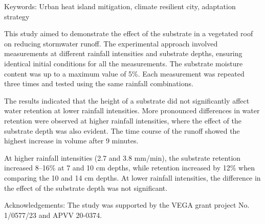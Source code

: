Keywords: Urban heat island mitigation, climate resilient city, adaptation strategy
\newpage{}
{}
\begin{flushleft}





\end{flushleft}

\noindent

This study aimed to demonstrate the effect of the substrate in a vegetated roof on reducing stormwater runoff. The experimental approach involved measurements at different rainfall intensities and substrate depths, ensuring identical initial conditions for all the measurements. The substrate moisture content was up to a maximum value of 5\%. Each measurement was repeated three times and tested using the same rainfall combinations.

The results indicated that the height of a substrate did not significantly affect water retention at lower rainfall intensities. More pronounced differences in water retention were observed at higher rainfall intensities, where the effect of the substrate depth was also evident. The time course of the runoff showed the highest increase in volume after 9 minutes.

At higher rainfall intensities (2.7 and 3.8 mm/min), the substrate retention increased 8–16\% at 7 and 10 cm depths, while retention increased by 12\% when comparing the 10 and 14 cm depths. At lower rainfall intensities, the difference in the effect of the substrate depth was not significant.

Acknowledgements: The study was supported by the VEGA grant project No. 1/0577/23 and APVV 20-0374.

